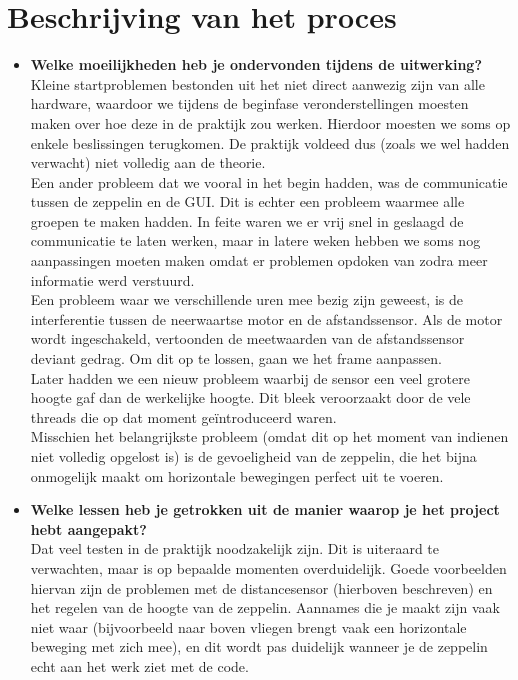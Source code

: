 \documentclass[eind]{penoverslag}
\begin{document}
\newpage\makeappendix

\section{Beschrijving van het proces}
\begin{itemize}
\item \textbf{Welke moeilijkheden heb je ondervonden tijdens de uitwerking?} \\
Kleine startproblemen bestonden uit het niet direct aanwezig zijn van alle hardware, waardoor we tijdens de beginfase veronderstellingen moesten maken over hoe deze in de praktijk zou werken. Hierdoor moesten we soms op enkele beslissingen terugkomen. De praktijk voldeed dus (zoals we wel hadden verwacht) niet volledig aan de theorie. \\
Een ander probleem dat we vooral in het begin hadden, was de communicatie tussen de zeppelin en de GUI. Dit is echter een probleem waarmee alle groepen te maken hadden. In feite waren we er vrij snel in geslaagd de communicatie te laten werken, maar in latere weken hebben we soms nog aanpassingen moeten maken omdat er problemen opdoken van zodra meer informatie werd verstuurd. \\
Een probleem waar we verschillende uren mee bezig zijn geweest, is de interferentie tussen de neerwaartse motor en de afstandssensor. Als de motor wordt ingeschakeld, vertoonden de meetwaarden van de afstandssensor deviant gedrag. Om dit op te lossen, gaan we het frame aanpassen. \\
Later hadden we een nieuw probleem waarbij de sensor een veel grotere hoogte gaf dan de werkelijke hoogte. Dit bleek veroorzaakt door de vele threads die op dat moment ge\"introduceerd waren. \\
Misschien het belangrijkste probleem (omdat dit op het moment van indienen niet volledig opgelost is) is de gevoeligheid van de zeppelin, die het bijna onmogelijk maakt om horizontale bewegingen perfect uit te voeren.
\item \textbf{Welke lessen heb je getrokken uit de manier waarop je het project hebt aangepakt?} \\
Dat veel testen in de praktijk noodzakelijk zijn. Dit is uiteraard te verwachten, maar is op bepaalde momenten overduidelijk. Goede voorbeelden hiervan zijn de problemen met de distancesensor (hierboven beschreven) en het regelen van de hoogte van de zeppelin. Aannames die je maakt zijn vaak niet waar (bijvoorbeeld naar boven vliegen brengt vaak een horizontale beweging met zich mee), en dit wordt pas duidelijk wanneer je de zeppelin echt aan het werk ziet met de code. \\

\end{itemize}
\end{document}
